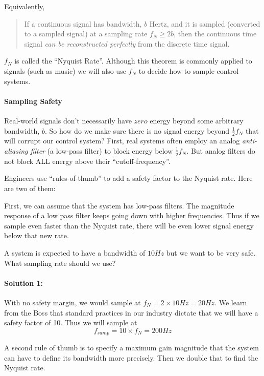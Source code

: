 Equivalently,

\begin{quotation}
  If a continuous signal has bandwidth, $b$ Hertz, and it is sampled (converted to a sampled signal) at a sampling rate
$f_N \geq  2b$, then the continuous time signal {\it can be reconstructed perfectly} from the discrete time signal.
\end{quotation}

$f_N$ is called the ``Nyquist Rate''.   Although this theorem is commonly applied to signals (such as music)
we will also use $f_N$ to decide how to sample control systems.

\paragraph{Sampling Safety}
Real-world signals don't necessarily have $zero$ energy beyond some arbitrary bandwidth, $b$.   So how do we make sure there is no signal
energy beyond $\frac{1}{2}f_N$  that will corrupt our control system?    First, real systems often employ an analog {\it anti-aliasing filter}
(a low-pass filter) to block energy below $\frac{1}{2}f_N$.  But analog filters do not
block ALL energy above their ``cutoff-frequency''.

Engineers use ``rules-of-thumb'' to add a safety factor to the Nyquist rate.   Here are two of them:

First, we can assume that the system has low-pass filters.  The magnitude response of a low pass filter keeps going down with higher frequencies.
Thus if we sample even faster than the Nyquist rate, there will be even lower signal energy below that new rate.

\begin{ExampleSmall}
A system is expected to have a bandwidth of $10Hz$ but we want to be very safe.   What sampling rate should we use?

\paragraph{Solution 1:}   With no safety margin, we would sample at $f_N  = 2\times10Hz = 20Hz$.   We learn from the Boss that standard practices
in our industry dictate that we will have a safety factor of 10.   Thus we will sample at
\[
f_{samp} = 10\times f_N = 200Hz
\]
\end{ExampleSmall}

A second rule of thumb is to specify a maximum gain magnitude that the system can have to define its bandwidth more precisely.  Then we double that to find the
Nyquist rate.

